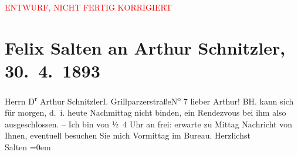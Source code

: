 
\begin{center}
            \textcolor{red}{ENTWURF, NICHT FERTIG KORRIGIERT}
                      \end{center}
            
         
         \renewcommand{\erwaehntePersonen}{Personen: Richard Beer-Hofmann}
         \renewcommand{\erwaehnteOrte}{Orte: Grillparzerstraße, I., Innere Stadt, Wien}
         \renewcommand{\erwaehnteWerke}{}
               \section[Felix Salten an Arthur Schnitzler, 30. 4. 1893]{ Felix Salten an Arthur Schnitzler, 30. 4. 1893}\nopagebreak{}\rehead{ }\begin{ledgroupsized}[t]{13cm}\normalsize\beginnumbering \toendnotes[C]{\smallbreak\pagebreak[2]} 
\pstart{}{\pb}Herrn D\textsuperscript{r} Arthur Schnitzler\pend{}\pstart{}I. Grillparzerstraße\pend{}\pstart{}N\textsuperscript{o} 7\pend{}{\bigskip}\pstart
           \noindent{}{\pb}lieber Arthur! BH. kann sich für morgen, d. i. heute
               Nachmittag nicht binden, ein Rendezvous bei ihm also ausgeschlossen. – Ich bin von
                  ½ 4 Uhr an frei: erwarte zu Mittag Nachricht von Ihnen, eventuell
               besuchen Sie mich Vormittag im Bureau.\pend
           \pstart
           Herzlichst {\\[\baselineskip]}\spacefill\mbox{Salten}\pend
           \leftskip=0em{}
         
         \endnumbering{}\end{ledgroupsized}\begin{anhang}\end{anhang}\newcommand{\dateiname}{L03121}\newcommand{\titel}{Felix Salten an Arthur Schnitzler, 30. 4. 1893}\newcommand{\editorInnen}{Martin Anton Müller und Laura Untner}
      